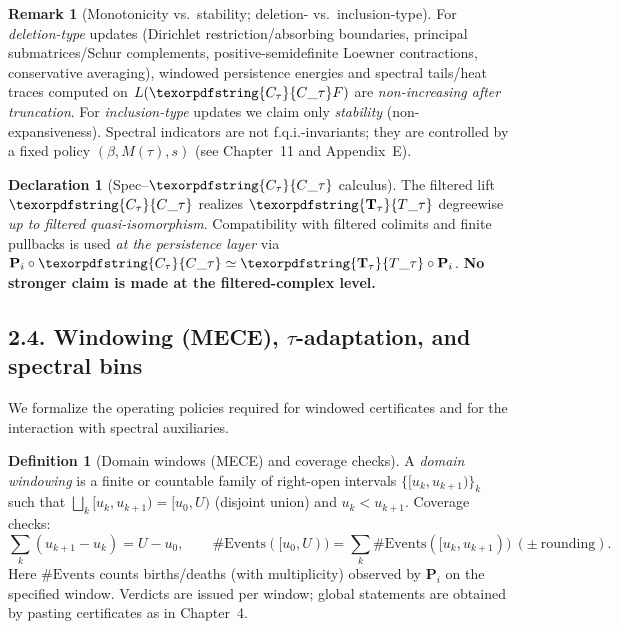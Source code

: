 \documentclass[11pt]{article}
\numberwithin{equation}{section}
\theoremstyle{plain}
\theoremstyle{definition}
\theoremstyle{remark}
\theoremstyle{plain}
\theoremstyle{definition}
\numberwithin{equation}{section}
\theoremstyle{definition}
\newtheorem{definition}[theorem]{Definition}
\newtheorem{remark}[theorem]{Remark}
\newtheorem{declaration}[theorem]{Declaration}
\DeclareRobustCommand{\Ttau}{\texorpdfstring{\ensuremath{\mathbf{T}_{\tau}}}{T\_\tau}}
\DeclareRobustCommand{\Ctau}{\texorpdfstring{\ensuremath{C_{\tau}}}{C\_\tau}}
\numberwithin{equation}{section}
\theoremstyle{plain}
\theoremstyle{definition}
\theoremstyle{remark}
\providecommand{\Cfun}[1]{\mathsf{C}_{#1}}
\providecommand{\Tfun}[1]{\mathbf{T}_{#1}}
\providecommand{\Ctau}{\Cfun{\tau}}
\providecommand{\Ttau}{\Tfun{\tau}}
\begin{document}
\begin{remark}[Monotonicity vs.\ stability; deletion- vs.\ inclusion-type]\label{rk:monotone-stable}
For \emph{deletion-type} updates (Dirichlet restriction/absorbing boundaries, principal submatrices/Schur complements, positive-semidefinite Loewner contractions, conservative averaging), windowed persistence energies and spectral tails/heat traces computed on \(L(\Ctau F)\) are \emph{non-increasing after truncation}. For \emph{inclusion-type} updates we claim only \emph{stability} (non-expansiveness). Spectral indicators are not f.q.i.-invariants; they are controlled by a fixed policy \((\beta,M(\tau),s)\) (see Chapter~11 and Appendix~E).
\end{remark}

\begin{declaration}[Spec–\texorpdfstring{$\Ctau$}{C\_\texttau} calculus]\label{spec:Ctau-calc}
The filtered lift \(\Ctau\) realizes \(\Ttau\) degreewise \emph{up to filtered quasi-isomorphism}. Compatibility with filtered colimits and finite pullbacks is used \emph{at the persistence layer} via \(\mathbf{P}_i\circ \Ctau\simeq \Ttau\circ \mathbf{P}_i\). \textbf{No stronger claim is made at the filtered-complex level.}
\end{declaration}

\subsection*{2.4. Windowing (MECE), \texorpdfstring{$\tau$}{tau}-adaptation, and spectral bins}
We formalize the operating policies required for windowed certificates and for the interaction with spectral auxiliaries.

\begin{definition}[Domain windows (MECE) and coverage checks]\label{def:ch2-mece}
A \emph{domain windowing} is a finite or countable family of right-open intervals \(\{[u_k,u_{k+1})\}_k\) such that \(\bigsqcup_k [u_k,u_{k+1})=[u_0,U)\) (disjoint union) and \(u_k<u_{k+1}\). Coverage checks:
\[
\sum_k (u_{k+1}-u_k)=U-u_0,\qquad \#\mathrm{Events}([u_0,U))=\sum_k \#\mathrm{Events}([u_k,u_{k+1}))\ (\pm\ \text{rounding}).
\]
Here \(\#\mathrm{Events}\) counts births/deaths (with multiplicity) observed by \(\mathbf{P}_i\) on the specified window. Verdicts are issued per window; global statements are obtained by pasting certificates as in Chapter~4.
\end{definition}
\end{document}
